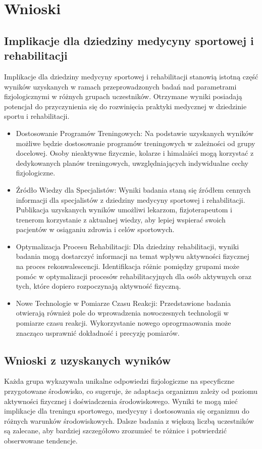 \chapter{Wnioski}
\section{Implikacje dla dziedziny medycyny sportowej i rehabilitacji}
Implikacje dla dziedziny medycyny sportowej i rehabilitacji stanowią istotną część wyników uzyskanych w ramach przeprowadzonych badań nad parametrami fizjologicznymi w różnych grupach uczestników. Otrzymane wyniki posiadają potencjał do przyczynienia się do rozwinięcia praktyki medycznej w dziedzinie sportu i rehabilitacji.
\begin{itemize}
    \item Dostosowanie Programów Treningowych: Na podstawie uzyskanych wyników możliwe będzie dostosowanie programów treningowych w zależności od grupy docelowej. Osoby nieaktywne fizycznie, kolarze i himalaiści mogą korzystać z dedykowanych planów treningowych, uwzględniających indywidualne cechy fizjologiczne.
    \item Źródło Wiedzy dla Specjalistów: Wyniki badania staną się źródłem cennych informacji dla specjalistów z dziedziny medycyny sportowej i rehabilitacji. Publikacja uzyskanych wyników umożliwi lekarzom, fizjoterapeutom i trenerom korzystanie z aktualnej wiedzy, aby lepiej wspierać swoich pacjentów w osiąganiu zdrowia i celów sportowych.
    \item Optymalizacja Procesu Rehabilitacji: Dla dziedziny rehabilitacji, wyniki badania mogą dostarczyć informacji na temat wpływu aktywności fizycznej na proces rekonwalescencji. Identifikacja różnic pomiędzy grupami może pomóc w optymalizacji procesów rehabilitacyjnych dla osób aktywnych oraz tych, które dopiero rozpoczynają aktywność fizyczną.
    \item Nowe Technologie w Pomiarze Czasu Reakcji: Przedstawione badania otwierają również pole do wprowadzenia nowoczesnych technologii w pomiarze czasu reakcji. Wykorzystanie nowego oprogrmaowania może znacząco usprawnić dokładność i precyzję pomiarów.
\end{itemize}

\section{Wnioski z uzyskanych wyników}
Każda grupa wykazywała unikalne odpowiedzi fizjologiczne na specyficzne przygotowane środowisko, co sugeruje, że adaptacja organizmu zależy od poziomu aktywności fizycznej i doświadczenia środowiskowego. Wyniki te mogą mieć implikacje dla treningu sportowego, medycyny i dostosowania się organizmu do różnych warunków środowiskowych. Dalsze badania z większą liczbą uczestników są zalecane, aby bardziej szczegółowo zrozumieć te różnice i potwierdzić obserwowane tendencje. 
